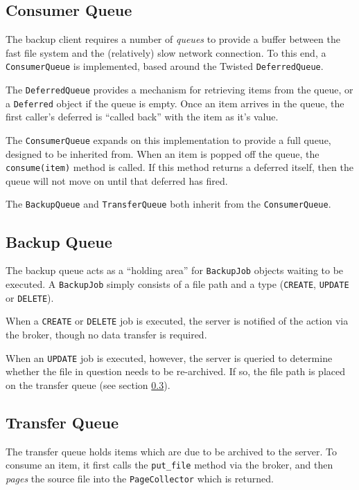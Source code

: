 \subsection{Consumer Queue}
\label{sec:implementation-client-consumerqueue}

The backup client requires a number of \emph{queues} to provide a buffer
between the fast file system and the (relatively) slow network connection. To
this end, a \verb!ConsumerQueue! is implemented, based around the Twisted
\verb!DeferredQueue!.

The \verb!DeferredQueue! provides a mechanism for retrieving items from the
queue, or a \verb!Deferred! object if the queue is empty. Once an item arrives
in the queue, the first caller's deferred is ``called back'' with the item as
it's value.

The \verb!ConsumerQueue! expands on this implementation to provide a full
queue, designed to be inherited from. When an item is popped off the queue, the
\verb!consume(item)! method is called. If this method returns a deferred
itself, then the queue will not move on until that deferred has fired.

The \verb!BackupQueue! and \verb!TransferQueue! both inherit from the
\verb!ConsumerQueue!.

\subsection{Backup Queue}
\label{sec:implementation-client-backupqueue}

The backup queue acts as a ``holding area'' for \verb!BackupJob! objects
waiting to be executed. A \verb!BackupJob! simply consists of a file path and
a type (\verb!CREATE!, \verb!UPDATE! or \verb!DELETE!).

When a \verb!CREATE! or \verb!DELETE! job is executed, the server is notified
of the action via the broker, though no data transfer is required.

When an \verb!UPDATE! job is executed, however, the server is queried to
determine whether the file in question needs to be re-archived. If so, the file
path is placed on the transfer queue (see section
\ref{sec:implementation-client-transferqueue}).

\subsection{Transfer Queue}
\label{sec:implementation-client-transferqueue}

The transfer queue holds items which are due to be archived to the server. To
consume an item, it first calls the \verb!put_file! method via the broker, and
then \emph{pages} the source file into the \verb!PageCollector! which is
returned.

